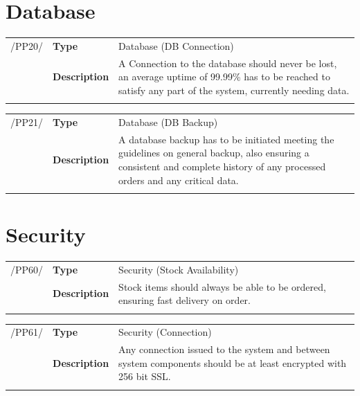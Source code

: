 \documentclass[11pt,a4paper,oneside,svgnames]{report}
\begin{document}
\section{Database}

\noindent
\begin{tabular}{llp{10cm}}
\cellcolor{white}/PP20/	& \textbf{Type}			& Database (DB Connection)\\
\cellcolor{white}		& \textbf{Description}	& A Connection to the database should never be lost, an average uptime of 99.99\% has to be reached to satisfy any part of the system, currently needing data.\\
\cellcolor{white}		\hfill \\
\end{tabular}

\noindent
\begin{tabular}{llp{10cm}}
\cellcolor{white}/PP21/	& \textbf{Type}			& Database (DB Backup)\\
\cellcolor{white}		& \textbf{Description}	& A database backup has to be initiated meeting the guidelines on general backup, also ensuring a consistent and complete history of any processed orders and any critical data.\\
\cellcolor{white}		\hfill \\
\end{tabular}

\section{Security}
\noindent
\begin{tabular}{llp{10cm}}
\cellcolor{white}/PP60/	& \textbf{Type}			& Security (Stock Availability)\\
\cellcolor{white}		& \textbf{Description}	& Stock items should always be able to be ordered, ensuring fast delivery on order.\\
\cellcolor{white}		\hfill \\
\end{tabular}

\noindent
\begin{tabular}{llp{10cm}}
\cellcolor{white}/PP61/	& \textbf{Type}			& Security (Connection)\\
\cellcolor{white}		& \textbf{Description}	& Any connection issued to the system and between system components should be at least encrypted with 256 bit SSL.\\
\cellcolor{white}		\hfill \\
\end{tabular}
\end{document}
